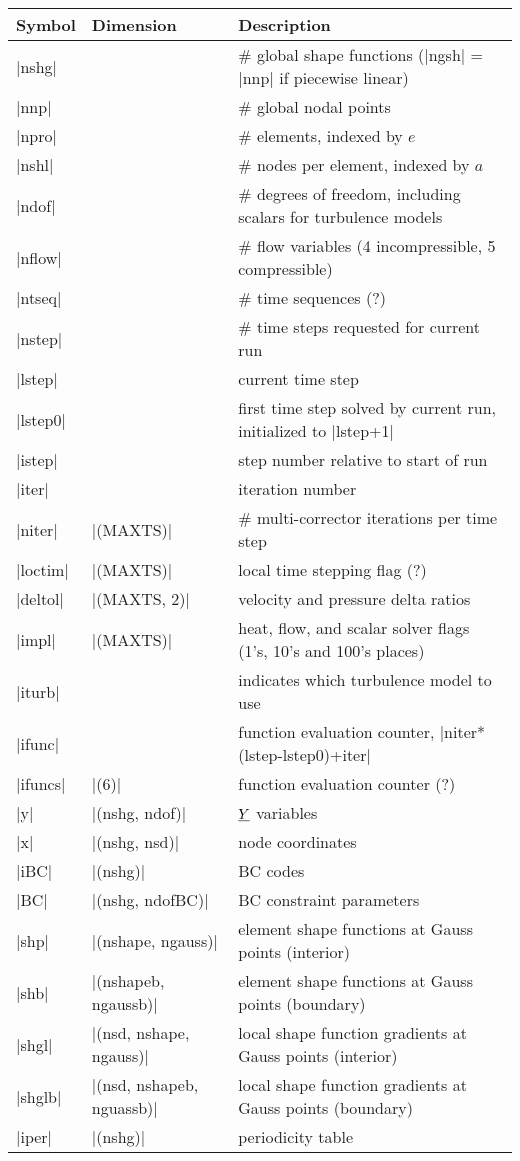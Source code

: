 \documentclass[11pt]{article}
\begin{document}
\begin{center}
\begin{tabular}{@{}lll@{}}
\toprule
Symbol & Dimension & Description \\
\midrule
|nshg|   &  & \# global shape functions (|ngsh| = |nnp| if piecewise linear) \\
|nnp|    &  & \# global nodal points \\
|npro|   &  & \# elements, indexed by $e$ \\
|nshl|   &  & \# nodes per element, indexed by $a$ \\
|ndof|   &  & \# degrees of freedom, including scalars for turbulence models \\
|nflow|  &  & \# flow variables (4 incompressible, 5 compressible) \\
|ntseq|  &  & \# time sequences (?) \\
|nstep|  &  & \# time steps requested for current run \\
|lstep|  &  & current time step \\
|lstep0| &  & first time step solved by current run, initialized to |lstep+1| \\
|istep|  &  & step number relative to start of run \\
|iter|   &  & iteration number \\
|niter|  & |(MAXTS)|    & \# multi-corrector iterations per time step \\
|loctim| & |(MAXTS)|    & local time stepping flag (?) \\
|deltol| & |(MAXTS, 2)| & velocity and pressure delta ratios \\
|impl|   & |(MAXTS)|    & heat, flow, and scalar solver flags (1's, 10's and 100's places) \\
|iturb|  &  & indicates which turbulence model to use \\
|ifunc|  &  & function evaluation counter, |niter*(lstep-lstep0)+iter| \\
|ifuncs| & |(6)|						& function evaluation counter (?) \\
|y|      & |(nshg, ndof)|            & $\underline{Y}$ variables \\
|x|      & |(nshg, nsd)|             & node coordinates \\
|iBC|    & |(nshg)|                  & BC codes \\
|BC|     & |(nshg, ndofBC)|          & BC constraint parameters \\
|shp|    & |(nshape, ngauss)|        & element shape functions at Gauss points (interior) \\
|shb|    & |(nshapeb, ngaussb)|      & element shape functions at Gauss points (boundary) \\
|shgl|   & |(nsd, nshape, ngauss)|   & local shape function gradients at Gauss points (interior) \\
|shglb|  & |(nsd, nshapeb, nguassb)| & local shape function gradients at Gauss points (boundary) \\
|iper|   & |(nshg)|				    & periodicity table \\
\bottomrule
\end{tabular}
\label{tbl:symbols}
\end{center}
\end{document}
